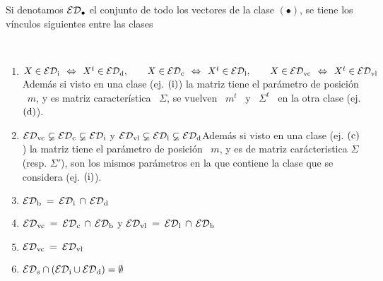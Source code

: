 Si  denotamos  $\mathcal{ED}_\bullet$  el conjunto  de  todo  los  vectores de  la  clase
$(\bullet)$, se tiene los v\'inculos siguientes entre las clases
%
\begin{lema}

  \

  \begin{enumerate}
  \item\label{Enum:MP:EDM_Transpuesta} $X \in \mathcal{ED}_{\mathrm{i}} \:\: \Leftrightarrow \:\:
    X^t \in  \mathcal{ED}_{\mathrm{d}}, \qquad X \in  \mathcal{ED}_{\mathrm{c}} \:\: \Leftrightarrow  \:\: X^t \in
    \mathcal{ED}_{\mathrm{l}},  \qquad  X  \in   \mathcal{ED}_{\mathrm{vc}}  \:\:  \Leftrightarrow  \:\:  X^t  \in
    \mathcal{ED}_{\mathrm{vl}}$\newline Adem\'as si  visto en una clase (ej.  $(\mathrm{i})$) la matriz
    tiene el  par\'ametro de  posici\'on \ $m$,  y es matriz  caracter\'istica \
    $\Sigma$,  se  vuelven  \  $m^t$  \  y  \ $\Sigma^t$  \  en  la  otra  clase
    (ej. $(\mathrm{d})$).
  \item\label{Enum:MP:EDM_Inclusiones}    $\mathcal{ED}_{\mathrm{vc}}    \varsubsetneq   \mathcal{ED}_{\mathrm{c}}
    \varsubsetneq  \mathcal{ED}_{\mathrm{i}}$ \qquad y  \qquad $\mathcal{ED}_{\mathrm{vl}}  \varsubsetneq \mathcal{ED}_{\mathrm{l}}
    \varsubsetneq   \mathcal{ED}_{\mathrm{d}}$\newline   Adem\'as   si   visto   en   una   clase
    (ej. $(\mathrm{c})$) la  matriz tiene el par\'ametro de posici\'on \  $m$, y es de
    matriz   car\'acteristica  $\Sigma$  (resp.   $\Sigma'$),  son   los  mismos
    par\'ametros en la que contiene la clase que se considera (ej. $(\mathrm{i})$).
  \item\label{Enum:MP:EDM_Bilateral}  $\mathcal{ED}_{\mathrm{b}}  \: =  \:  \mathcal{ED}_{\mathrm{i}}  \, \cap  \,
    \mathcal{ED}_{\mathrm{d}}$
  \item\label{Enum:MP:EDM_VcBilateral} $\mathcal{ED}_{\mathrm{vc}}  \: =  \: \mathcal{ED}_{\mathrm{c}} \,  \cap \,
    \mathcal{ED}_{\mathrm{b}}$ \qquad y \qquad $\mathcal{ED}_{\mathrm{vl}} \: = \: \mathcal{ED}_{\mathrm{l}} \, \cap \, \mathcal{ED}_{\mathrm{b}}$
  \item\label{Enum:MP:EDM_VcVlIdenticos} $\mathcal{ED}_{\mathrm{vc}}  \: =  \: \mathcal{ED}_{\mathrm{vl}}$
  \item\label{Enum:MP:EDM_Simetrica}  $\mathcal{ED}_{\mathrm{s}}   \cap  \left(  \mathcal{ED}_{\mathrm{i}}  \cup
      \mathcal{ED}_{\mathrm{d}} \right) = \emptyset$
  \end{enumerate}
\end{lema}
%
